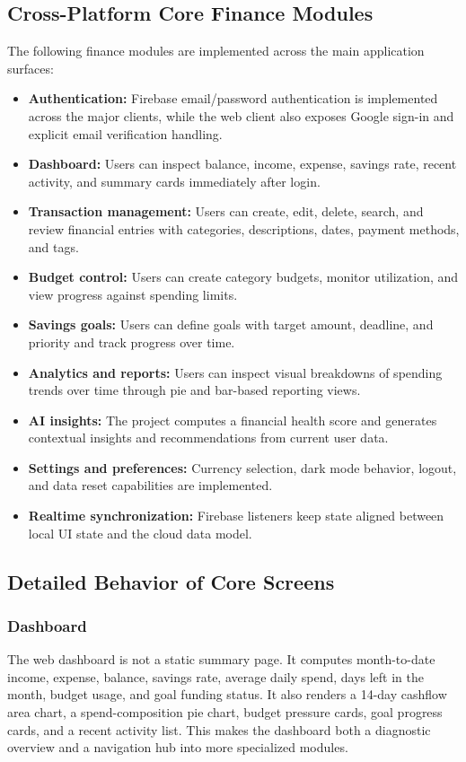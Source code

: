 \documentclass[conference]{IEEEtran}
\begin{document}
\subsection{Cross-Platform Core Finance Modules}
The following finance modules are implemented across the main application surfaces:
\begin{itemize}
\item \textbf{Authentication:} Firebase email/password authentication is implemented across the major clients, while the web client also exposes Google sign-in and explicit email verification handling.
\item \textbf{Dashboard:} Users can inspect balance, income, expense, savings rate, recent activity, and summary cards immediately after login.
\item \textbf{Transaction management:} Users can create, edit, delete, search, and review financial entries with categories, descriptions, dates, payment methods, and tags.
\item \textbf{Budget control:} Users can create category budgets, monitor utilization, and view progress against spending limits.
\item \textbf{Savings goals:} Users can define goals with target amount, deadline, and priority and track progress over time.
\item \textbf{Analytics and reports:} Users can inspect visual breakdowns of spending trends over time through pie and bar-based reporting views.
\item \textbf{AI insights:} The project computes a financial health score and generates contextual insights and recommendations from current user data.
\item \textbf{Settings and preferences:} Currency selection, dark mode behavior, logout, and data reset capabilities are implemented.
\item \textbf{Realtime synchronization:} Firebase listeners keep state aligned between local UI state and the cloud data model.
\end{itemize}

\subsection{Detailed Behavior of Core Screens}
\subsubsection{Dashboard}
The web dashboard is not a static summary page. It computes month-to-date income, expense, balance, savings rate, average daily spend, days left in the month, budget usage, and goal funding status. It also renders a 14-day cashflow area chart, a spend-composition pie chart, budget pressure cards, goal progress cards, and a recent activity list. This makes the dashboard both a diagnostic overview and a navigation hub into more specialized modules.
\end{document}
